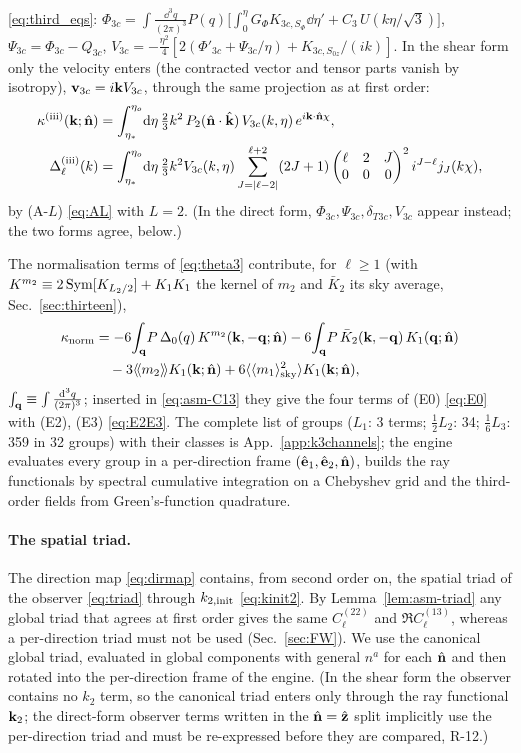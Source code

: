 \begin{itemize}
\eqref{eq:third_eqs}: $\Phi_{3c}=\int\frac{\dd^3q}{(2\pi)^3}P(q)\big[\int_0^\eta G_\Phi K_{3c,S_\Phi}\dd\eta'+C_3\,U(k\eta/\sqrt3)\big]$, $\Psi_{3c}=\Phi_{3c}-Q_{3c}$,
$V_{3c}=-\tfrac{\eta^2}4[2(\Phi'_{3c}+\Psi_{3c}/\eta)+K_{3c,S_{0z}}/(ik)]$.  In the shear form only the velocity enters (the contracted vector and
tensor parts vanish by isotropy), $\mathbf v_{3c}=i\mathbf k V_{3c}$, through the same projection as at first order:
\begin{align}
\kappa^{\rm(iii)}(\mathbf k;\hat{\mathbf n})&=\int_{\eta_*}^{\eta_o}\!\mathrm d\eta\,\tfrac23k^2\,P_2(\hat{\mathbf n}\cdot\hat{\mathbf k})\,V_{3c}(k,\eta)\,e^{i\mathbf k\cdot\hat{\mathbf n}\chi},\nonumber\\
\Delta^{\rm(iii)}_\ell(k)&=\int_{\eta_*}^{\eta_o}\!\mathrm d\eta\,\tfrac23k^2V_{3c}(k,\eta)\sum_{J=|\ell-2|}^{\ell+2}(2J+1)\begin{pmatrix}\ell&2&J\\0&0&0\end{pmatrix}^2i^{J-\ell}j_J(k\chi),
\label{eq:asm-classiii}
\end{align}
by (A-$L$) \eqref{eq:AL} with $L=2$.  (In the direct form, $\Phi_{3c},\Psi_{3c},\delta_{T3c},V_{3c}$ appear instead; the two forms agree, below.)
\end{itemize}
The normalisation terms of \eqref{eq:theta3} contribute, for $\ell\ge1$ (with $K^{m_2}\equiv2\,{\rm Sym}[K_{L_2/2}]+K_1K_1$ the kernel of $m_2$ and
$\bar K_2$ its sky average, Sec.~\ref{sec:thirteen}),
\begin{align}
\kappa_{\rm norm}&=-6\!\int_{\mathbf q}\!P\,\Delta_0(q)\,K^{m_2}(\mathbf k,-\mathbf q;\hat{\mathbf n})-6\!\int_{\mathbf q}\!P\,\bar K_2(\mathbf k,-\mathbf q)\,K_1(\mathbf q;\hat{\mathbf n})\nonumber\\
&\quad-3\langle\!\langle m_2\rangle\!\rangle K_1(\mathbf k;\hat{\mathbf n})+6\langle\langle m_1\rangle_{\rm sky}^2\rangle K_1(\mathbf k;\hat{\mathbf n}),
\label{eq:asm-kappanorm}
\end{align}
$\int_\mathbf q\equiv\int\frac{\mathrm d^3q}{(2\pi)^3}$; inserted in \eqref{eq:asm-C13} they give the four terms of (E0) \eqref{eq:E0} with (E2), (E3)
\eqref{eq:E2E3}.  The complete list of groups ($L_1$: 3 terms; $\tfrac12L_2$: 34; $\tfrac16L_3$: 359 in 32 groups) with their classes is
App.~\ref{app:k3channels}; the engine evaluates every group in a per-direction frame $(\hat{\mathbf e}_1,\hat{\mathbf e}_2,\hat{\mathbf n})$, builds the ray functionals by
spectral cumulative integration on a Chebyshev grid and the third-order fields from Green's-function quadrature.

\paragraph{The spatial triad.}  The direction map \eqref{eq:dirmap} contains, from second order on, the spatial triad of the observer
\eqref{eq:triad} through $k_{2,\rm init}$ \eqref{eq:kinit2}.  By Lemma~\ref{lem:asm-triad} any global triad that agrees at first order gives the same
$C^{(22)}_\ell$ and $\Re C^{(13)}_\ell$, whereas a per-direction triad must not be used (Sec.~\ref{sec:FW}).  We use the canonical global triad, evaluated
in global components with general $n^a$ for each $\hat{\mathbf n}$ and then rotated into the per-direction frame of the engine.  (In the shear form the
observer contains no $k_2$ term, so the canonical triad enters only through the ray functional $\mathbf k_2$; the direct-form observer terms written in the
$\hat{\mathbf n}=\hat{\mathbf z}$ split implicitly use the per-direction triad and must be re-expressed before they are compared, R-12.)

